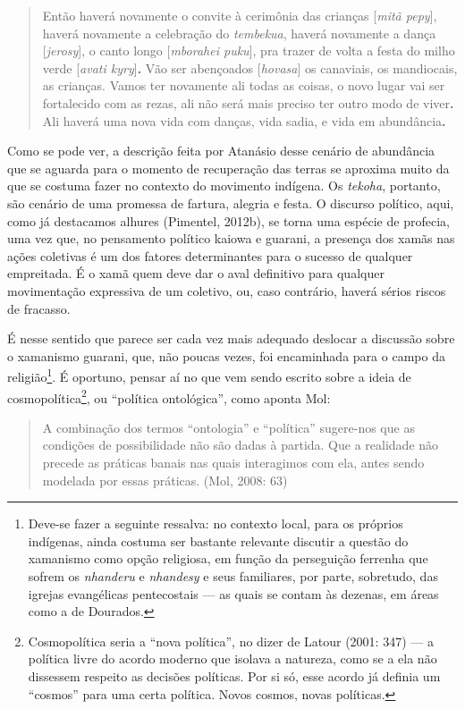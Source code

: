 \begin{quote}
Então haverá novamente o convite à cerimônia das crianças {[}\emph{mitã
pepy}{]}, haverá novamente a celebração do \emph{tembekua}, haverá
novamente a dança {[}\emph{jerosy}{]}, o canto longo {[}\emph{mborahei
puku}{]}, pra trazer de volta a festa do milho verde {[}\emph{avati
kyry}{]}\textbf{.} Vão ser abençoados {[}\emph{hovasa}{]} os canaviais,
os mandiocais, as crianças. Vamos ter novamente ali todas as coisas, o
novo lugar vai ser fortalecido com as rezas, ali não será mais preciso
ter outro modo de viver\textbf{.} Ali haverá uma nova vida com danças,
vida sadia, e vida em abundância\textbf{.}
\end{quote}

Como se pode ver, a descrição feita por Atanásio desse cenário de
abundância que se aguarda para o momento de recuperação das terras se
aproxima muito da que se costuma fazer no contexto do movimento
indígena. Os \emph{tekoha}, portanto, são cenário de uma promessa de
fartura, alegria e festa. O discurso político, aqui, como já destacamos
alhures (Pimentel, 2012b), se torna uma espécie de profecia, uma vez
que, no pensamento político kaiowa e guarani, a presença dos xamãs nas
ações coletivas é um dos fatores determinantes para o sucesso de
qualquer empreitada. É o xamã quem deve dar o aval definitivo para
qualquer movimentação expressiva de um coletivo, ou, caso contrário,
haverá sérios riscos de fracasso.

É nesse sentido que parece ser cada vez mais adequado deslocar a
discussão sobre o xamanismo guarani, que, não poucas vezes, foi
encaminhada para o campo da religião\footnote{Deve-se fazer a seguinte
  ressalva: no contexto local, para os próprios indígenas, ainda costuma
  ser bastante relevante discutir a questão do xamanismo como opção
  religiosa, em função da perseguição ferrenha que sofrem os
  \emph{nhanderu} e \emph{nhandesy} e seus familiares, por parte,
  sobretudo, das igrejas evangélicas pentecostais --- as quais se contam
  às dezenas, em áreas como a de Dourados.}. É oportuno, pensar aí no
que vem sendo escrito sobre a ideia de cosmopolítica\footnote{Cosmopolítica
  seria a ``nova política'', no dizer de Latour (2001: 347) --- a
  política livre do acordo moderno que isolava a natureza, como se a ela
  não dissessem respeito as decisões políticas. Por si só, esse acordo
  já definia um ``cosmos'' para uma certa política. Novos cosmos, novas
  políticas.}, ou ``política ontológica'', como aponta Mol:

\begin{quote}
A combinação dos termos ``ontologia'' e ``política'' sugere-nos que as
condições de possibilidade não são dadas à partida. Que a realidade não
precede as práticas banais nas quais interagimos com ela, antes sendo
modelada por essas práticas. (Mol, 2008: 63)
\end{quote}

